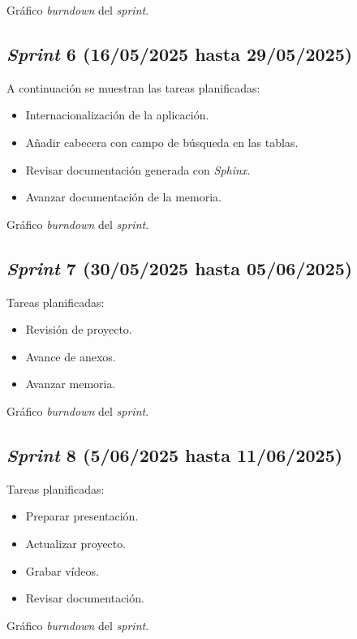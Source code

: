 Gráfico \textit{burndown} del \textit{sprint}.

\subsection{\emph{Sprint} 6 (16/05/2025 hasta 29/05/2025)}
A continuación se muestran las tareas planificadas:
\begin{itemize}
    \item Internacionalización de la aplicación.
    \item Añadir cabecera con campo de búsqueda en las tablas.
    \item Revisar documentación generada con \textit{Sphinx}.
    \item Avanzar documentación de la memoria.
\end{itemize}

Gráfico \textit{burndown} del \textit{sprint}.

\subsection{\emph{Sprint} 7 (30/05/2025 hasta 05/06/2025)}
Tareas planificadas:
\begin{itemize}
    \item Revisión de proyecto.
    \item Avance de anexos.
    \item Avanzar memoria.
\end{itemize}

Gráfico \textit{burndown} del \textit{sprint}.

\subsection{\emph{Sprint} 8 (5/06/2025 hasta 11/06/2025)}
Tareas planificadas:
\begin{itemize}
    \item Preparar presentación.
    \item Actualizar proyecto.
    \item Grabar vídeos.
    \item Revisar documentación.
\end{itemize}

Gráfico \textit{burndown} del \textit{sprint}.


